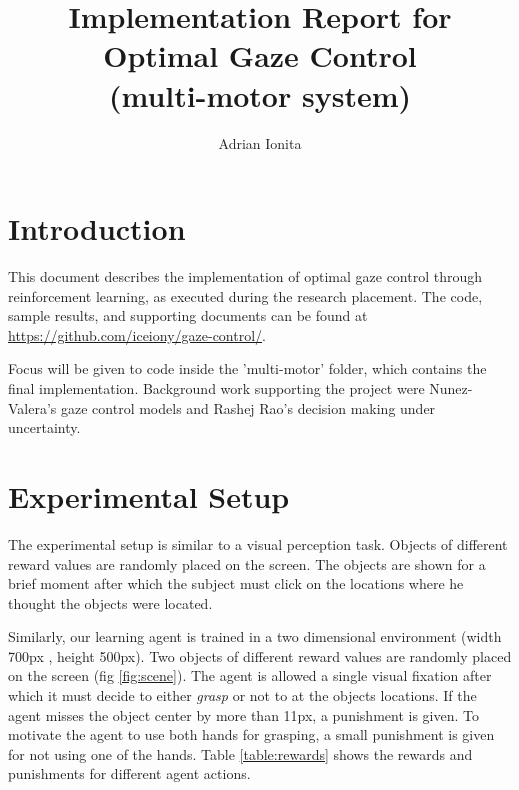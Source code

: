 \documentclass[11]{article}
\author{Adrian Ionita}
\title { Implementation Report for\\
Optimal Gaze Control\\
  \normalsize (multi-motor system) }
\begin{document}
\maketitle 	

\section{Introduction}
This document describes the implementation of optimal gaze control through reinforcement learning, as executed during the research placement. The code, sample results, and supporting documents can be found at \\
\href{url}{https://github.com/iceiony/gaze-control/}. 

Focus will be given to code inside the 'multi-motor' folder, which contains the final implementation. Background work supporting the project were Nunez-Valera's gaze control models\cite{nunezvalera} and Rashej Rao's decision making under uncertainty\cite{rashejrao}.

\section{Experimental Setup}
The experimental setup is similar to a visual perception task. Objects of different reward values are randomly placed on the screen. The objects are shown for a brief moment after which the subject must click on the locations where he thought the objects were located. 

Similarly, our learning agent is trained in a two dimensional environment (width 700px , height 500px). Two objects of different reward values are randomly placed on the screen (fig \ref{fig:scene}). The agent is allowed a single visual fixation after which it must decide to either \textit{grasp} or not to at the objects locations. If the agent misses the object center by more than 11px, a punishment is given. To motivate the agent to use both hands for grasping, a small punishment is given for not using one of the hands. Table \ref{table:rewards} shows the rewards and punishments for different agent actions.
\end{document}
